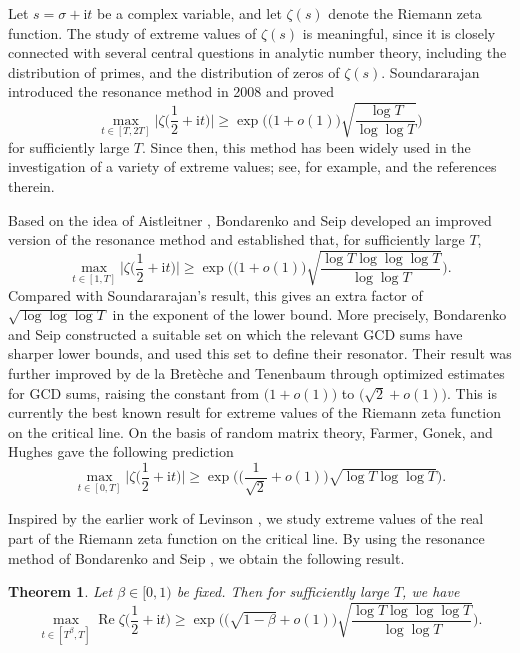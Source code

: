 \documentclass[12pt,reqno]{amsart}
\newtheorem{thm}{Theorem}[section]
\theoremstyle{definition}
\numberwithin{equation}{section}
\newcommand{\bg}{\big}
\newcommand{\bgl}{\big(}
\newcommand{\bgr}{\big)}
\newcommand{\bggl}{\bigg(}
\newcommand{\bggr}{\bigg)}
\newcommand{\Bg}{\Big}
\newcommand{\Bgl}{\Big(}
\newcommand{\Bgr}{\Big)}
\newcommand{\mit}{\mathrm{i}t}
\newcommand{\re}{\operatorname{Re}}
\begin{document}
Let \(s=\sigma + \mit\) be a complex variable, and let \(\zeta(s)\) denote the Riemann zeta function. The study of extreme values of \(\zeta(s)\) is meaningful, since it is closely connected with several central questions in analytic number theory, including the distribution of primes,  and the distribution of zeros of \(\zeta(s)\). Soundararajan \cite{soundararajan2008extreme} introduced the resonance method in 2008 and proved
\[
\max_{t \in [T,2T]} \Bg|\zeta\Bgl\frac{1}{2}+\mit \Bgr \Bg| \ge \exp \bggl \bg(1+o(1)\bg) \sqrt{\frac{\log T}{\log\log T}} \bggr
\]
for sufficiently large \(T\). Since then, this method has been widely used in the investigation of a variety of extreme values; see, for example, \cite{aistleitner2019IMRN,Aistleitner2019QJMath,bondarenko2017large,bondarenko2018argument,chirre2019extreme,yang2022extreme,yang2024extreme,qiyu2024JNT} and the references therein.
\par
Based on the idea of Aistleitner \cite{aistleitner2016MathAnn}, Bondarenko and Seip \cite{bondarenko2017large,bondarenko2018argument} developed an improved version of the resonance method and established that, for sufficiently large \(T\),
\[
\max_{t \in [1,T]} \Bg|\zeta\Bgl\frac{1}{2}+\mit \Bgr \Bg| \ge \exp \bggl \bg(1+o(1)\bg) \sqrt{\frac{\log T \log\log\log T}{\log\log T}} \bggr.
\]
Compared with Soundararajan's result, this gives an extra factor of \(\sqrt{\log\log\log T}\) in the exponent of the lower bound. More precisely, Bondarenko and Seip constructed a suitable set on which the relevant GCD sums have sharper lower bounds, and used this set to define their resonator. Their result was further improved by de la Bretèche and Tenenbaum \cite{dlB2019galsum} through optimized estimates for GCD sums, raising the constant from \(\bg(1+o(1)\bg)\) to \(\bgl \sqrt{2}+o(1) \bgr\). This is currently the best known result for extreme values of the Riemann zeta function on the critical line. On the basis of random matrix theory, Farmer, Gonek, and Hughes \cite{Farmer2007JRAM} gave the following prediction
\[
\max_{t \in [0,T]} \Bg|\zeta\Bgl\frac{1}{2}+\mit \Bgr \Bg| \ge \exp \Bgl \bgl \frac{1}{\sqrt{2}}+o(1) \Bgr \sqrt{\log T \log\log T}\Bgr.
\]
\par
Inspired by the earlier work of Levinson \cite{Levinson1973JMAA}, we study extreme values of the real part of the Riemann zeta function on the critical line. By using the resonance method of Bondarenko and Seip \cite{bondarenko2018argument}, we obtain the following result.
\begin{thm}
    \label{thm1}
    Let \(\beta \in [0,1)\) be fixed. Then for sufficiently large \(T\), we have
    \[
    \max_{t \in [T^\beta,T]} \re \zeta  \Bgl\frac{1}{2}+\mit\Bgr \ge \exp\bggl\bgl\sqrt{1-\beta}+o(1)\bgr\sqrt{\frac{\log T \log\log\log T}{\log\log T}} \bggr.
    \]
\end{thm}
\end{document}
